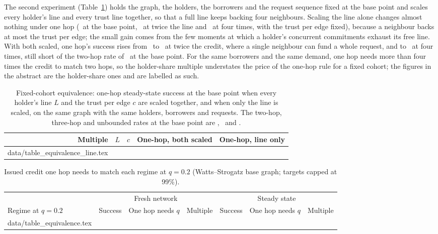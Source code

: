 \documentclass[11pt]{article}
\makeatletter
\theoremstyle{plain}
\theoremstyle{definition}
\newcommand{\inputrows}[1]{\@@input #1 }
\makeatother
\begin{document}
The second experiment (Table~\ref{tab:line}) holds the graph, the holders, the borrowers and the
request sequence fixed at the base point and scales every holder's line and every trust line
together, so that a full line keeps backing four neighbours. Scaling the line alone changes almost
nothing under one hop (\OneHopAtBase\ at the base point, \OneHopLineOnlyDouble\ at twice the line and
\OneHopLineOnlyQuadruple\ at four times, with the trust per edge fixed), because a neighbour backs at
most the trust per edge; the small gain comes from the few moments at which a holder's concurrent
commitments exhaust its free line. With both scaled, one hop's success rises from \OneHopAtBase\ to
\OneHopAtDouble\ at twice the credit, where a single neighbour can fund a whole request, and to
\OneHopAtQuadruple\ at four times, still short of the two-hop rate of \TargetTwo\ at the base point.
For the same borrowers and the same demand, one hop needs more than four times the credit to match
two hops, so the holder-share multiple understates the price of the one-hop rule for a fixed cohort;
the figures in the abstract are the holder-share ones and are labelled as such.

\begin{table}[ht]
  \centering\small
  \caption{Fixed-cohort equivalence: one-hop steady-state success at the base point when every
  holder's line $L$ and the trust per edge $c$ are scaled together, and when only the line is
  scaled, on the same graph with the same holders, borrowers and requests. The two-hop, three-hop
  and unbounded rates at the base point are \TargetTwo, \TargetThree\ and \TargetUnb.}
  \label{tab:line}
  \begin{tabular}{rrrrr}
    \toprule
    Multiple & $L$ & $c$ & One-hop, both scaled & One-hop, line only \\
    \midrule
    \inputrows{data/table_equivalence_line.tex}
    \bottomrule
  \end{tabular}
\end{table}

\begin{table}[ht]
  \centering\small
  \caption{Issued credit one hop needs to match each regime at $q=0.2$ (Watts--Strogatz base graph;
  targets capped at 99\%).}
  \label{tab:equivalence}
  \begin{tabular}{lrrrrrr}
    \toprule
    & \multicolumn{3}{c}{Fresh network} & \multicolumn{3}{c}{Steady state} \\
    \cmidrule(lr){2-4}\cmidrule(lr){5-7}
    Regime at $q=0.2$ & Success & One hop needs $q$ & Multiple & Success & One hop needs $q$ & Multiple \\
    \midrule
    \inputrows{data/table_equivalence.tex}
    \bottomrule
  \end{tabular}
\end{table}
\end{document}
